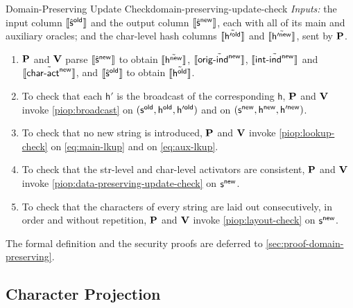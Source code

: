 \begin{DefinePIOP}{Domain-Preserving Update Check}{domain-preserving-update-check}
  \emph{Inputs:} the input column $\llbracket\hat{\mathsf{s}}^{\mathsf{old}}\rrbracket$ and the output column $\llbracket\hat{\mathsf{s}}^{\mathsf{new}}\rrbracket$, each with all of its main and auxiliary oracles; and the char-level hash columns $\llbracket\tilde{\mathsf{h}'^{\mathsf{old}}}\rrbracket$ and $\llbracket\tilde{\mathsf{h}'^{\mathsf{new}}}\rrbracket$, sent by $\bf{P}$.
  \begin{enumerate}[nosep]
    \item $\bf{P}$ and $\bf{V}$ parse $\llbracket\hat{\mathsf{s}}^{\mathsf{new}}\rrbracket$ to obtain $\llbracket\tilde{\mathsf{h}^{\mathsf{new}}}\rrbracket$, $\llbracket\tilde{\mathsf{orig\text{-}ind}^{\mathsf{new}}}\rrbracket$, $\llbracket\tilde{\mathsf{int\text{-}ind}^{\mathsf{new}}}\rrbracket$ and $\llbracket\tilde{\mathsf{char\text{-}act}^{\mathsf{new}}}\rrbracket$, and $\llbracket\hat{\mathsf{s}}^{\mathsf{old}}\rrbracket$ to obtain $\llbracket\tilde{\mathsf{h}^{\mathsf{old}}}\rrbracket$.
    \item To check that each $\mathsf{h}'$ is the broadcast of the corresponding $\mathsf{h}$, $\bf{P}$ and $\bf{V}$ invoke \cref{piop:broadcast} on $(\mathsf{s}^{\mathsf{old}}, \mathsf{h}^{\mathsf{old}}, \mathsf{h}'^{\mathsf{old}})$ and on $(\mathsf{s}^{\mathsf{new}}, \mathsf{h}^{\mathsf{new}}, \mathsf{h}'^{\mathsf{new}})$.
    \item To check that no new string is introduced, $\bf{P}$ and $\bf{V}$ invoke \cref{piop:lookup-check} on \cref{eq:main-lkup} and on \cref{eq:aux-lkup}.
    \item To check that the str-level and char-level activators are consistent, $\bf{P}$ and $\bf{V}$ invoke \cref{piop:data-preserving-update-check} on $\mathsf{s}^{\mathsf{new}}$.
    \item To check that the characters of every string are laid out consecutively, in order and without repetition, $\bf{P}$ and $\bf{V}$ invoke \cref{piop:layout-check} on $\mathsf{s}^{\mathsf{new}}$.
  \end{enumerate}
\end{DefinePIOP}

The formal definition and the security proofs are deferred to \cref{sec:proof-domain-preserving}.

\subsection{Character Projection}
\label{sec:char-projection}

